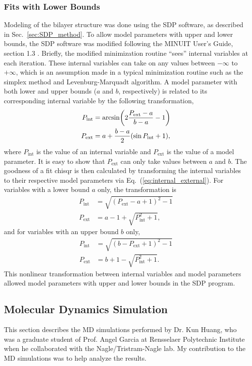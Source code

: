 \subsubsection{Fits with Lower Bounds}
Modeling of the bilayer structure was done using the SDP software, 
as described in Sec.~\ref{sec:SDP_method}.
To allow model parameters with upper and lower bounds, the
SDP software was modified following the MINUIT User's Guide, section 1.3 
\cite{minuit}. 
Briefly, the modified minimization routine ``sees'' internal variables 
at each iteration. These internal variables can take on
any values between $-\infty$ to $+\infty$, which is an assumption made
in a typical minimization routine such as 
the simplex method and Levenburg-Marquadt algorithm.
A model parameter with both lower and upper bounds ($a$ and $b$, respectively) 
is related to its corresponding internal variable by the following transformation,
\begin{align}
  P_\textrm{int} &= \arcsin \mathopen{}\left( 2\frac{P_\textrm{ext}-a}{b-a}-1 \right)\mathclose{}  \\
  P_\textrm{ext} &= a + \frac{b-a}{2}(\sin P_\textrm{int}+1),
  \label{eq:internal_external}
\end{align}
where $P_\text{int}$ is the value of an internal variable and
$P_\text{ext}$ is the value of a model parameter. It is easy to show that
$P_\text{ext}$ can only take values between $a$ and $b$.
The goodness of a fit \gls{chisqr} is then calculated by transforming the
internal variables to their respective model parameters via Eq.~(\ref{eq:internal_external}). 
For variables with a lower bound $a$ only, the transformation is
\begin{align}
  P_\textrm{int} &= \sqrt{(P_\textrm{ext}-a+1)^2 - 1} \\
  P_\textrm{ext} &= a - 1 + \sqrt{P_\textrm{int}^2+1}, 
\end{align}
and for variables with an upper bound $b$ only,
\begin{align}
  P_\textrm{int} &= \sqrt{(b-P_\textrm{ext}+1)^2 - 1} \\
  P_\textrm{ext} &= b + 1 - \sqrt{P_\textrm{int}^2+1}.
\end{align}
This nonlinear transformation between internal variables and model parameters 
allowed model parameters with upper and lower bounds in
the SDP program.

\newpage
\subsection{Molecular Dynamics Simulation}\label{sec:sim_methods}
This section describes the MD simulations performed by Dr. Kun Huang, who was
a graduate student of Prof. Angel Garcia at Rensselaer Polytechnic Institute
when he collaborated with the Nagle/Tristram-Nagle lab.
My contribution to the MD simulations was to help analyze the results.

